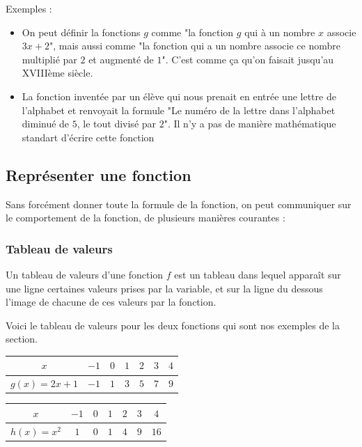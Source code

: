 \documentclass[10pt,a4paper]{book}
\begin{document}
Exemples :
\begin{itemize}
    \item On peut définir la fonctions $g$ comme "la fonction $g$ qui à un nombre $x$ associe $3x+2$", mais aussi comme "la fonction qui a un nombre associe ce nombre multiplié par $2$ et augmenté de $1$". C'est comme ça qu'on faisait jusqu'au XVIIIème siècle.
    \item La fonction inventée par un élève qui nous prenait en entrée une lettre de l'alphabet et renvoyait la formule "Le numéro de la lettre dans l'alphabet diminué de $5$, le tout divisé par $2$". Il n'y a pas de manière mathématique standart d'écrire cette fonction
\end{itemize}

\subsection{Représenter une fonction}

Sans forcément donner toute la formule de la fonction, on peut communiquer sur le comportement de la fonction, de plusieurs manières courantes :

\subsubsection{Tableau de valeurs}


\begin{de}
    Un tableau de valeurs d'une fonction $f$ est un tableau dans lequel apparaît sur une ligne certaines valeurs prises par la variable, et sur la ligne du dessous l'image de chacune de ces valeurs par la fonction.
\end{de}

Voici le tableau de valeurs pour les deux fonctions qui sont nos exemples de la section.

\begin{minipage}{0.45\textwidth}
    \begin{center}
        \begin{tabular}{|c|c|c|c|c|c|c|}
        \hline
             $x$ & $-1$ & $0$ & $1$ & $2$&$3$ & $4$ \\
        \hline
             $g(x)=2x+1$ & $-1$ & $1$ &$3$&$5$&$7$&$9$ \\
        \hline
        \end{tabular}
    \end{center}
    \end{minipage}
\begin{minipage}{0.45\textwidth}
\begin{center}
    \begin{tabular}{|c|c|c|c|c|c|c|}
    \hline
         $x$ & $-1$ & $0$ & $1$ & $2$&$3$ & $4$ \\
    \hline
         $h(x) = x^2$ & $1$ & $0$ &$1$&$4$&$9$&$16$ \\
    \hline
    \end{tabular}
\end{center}
\end{minipage}
\end{document}
